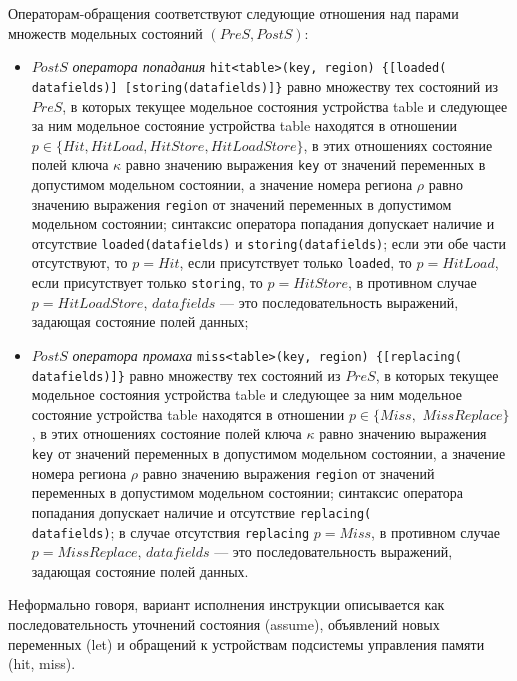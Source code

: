 Операторам-обращения соответствуют следующие отношения над парами множеств модельных состояний $(PreS, PostS)$:
\begin{itemize}
  \item $PostS$ \emph{оператора попадания} \texttt{hit<table>(key, region) \{[loaded(} \\ \texttt{datafields)] [storing(datafields)]\}} равно множеству тех состояний из $PreS$, в которых текущее модельное состояния устройства table и следующее за ним модельное состояние устройства table находятся в отношении $p \in \{Hit, HitLoad, HitStore, HitLoadStore\}$, в этих отношениях состояние полей ключа $\kappa$ равно значению выражения \texttt{key} от значений переменных в допустимом модельном состоянии, а значение номера региона $\rho$ равно значению выражения \texttt{region} от значений переменных в допустимом модельном состоянии; синтаксис оператора попадания допускает наличие и отсутствие \texttt{loaded(datafields)} и \texttt{storing(datafields)}; если эти обе части отсутствуют, то $p = Hit$, если присутствует только \texttt{loaded}, то $p = HitLoad$, если присутствует только \texttt{storing}, то $p = HitStore$, в противном случае $p = HitLoadStore$, $datafields$ --- это последовательность выражений, задающая состояние полей данных;
  \item $PostS$ \emph{оператора промаха} \texttt{miss<table>(key, region) \{[replacing(} \\ \texttt{datafields)]\}} равно множеству тех состояний из $PreS$, в которых текущее модельное состояния устройства table и следующее за ним модельное состояние устройства table находятся в отношении $p \in \{Miss,$ $MissReplace\}$, в этих отношениях состояние полей ключа $\kappa$ равно значению выражения \texttt{key} от значений переменных в допустимом модельном состоянии, а значение номера региона $\rho$ равно значению выражения \texttt{region} от значений переменных в допустимом модельном состоянии; синтаксис оператора попадания допускает наличие и отсутствие \texttt{replacing(}\\ \texttt{datafields)}; в случае отсутствия \texttt{replacing} $p = Miss$, в противном случае $p = MissReplace$, $datafields$ --- это последовательность выражений, задающая состояние полей данных.
\end{itemize}

Неформально говоря, вариант исполнения инструкции описывается как последовательность уточнений состояния (assume), объявлений новых переменных (let) и обращений к устройствам подсистемы управления памяти (hit, miss).

